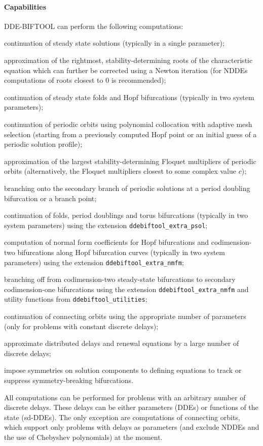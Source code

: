 \documentclass[10pt]{scrartcl}
\newcommand{\DDEBIFCODE}{\textsc{DDE-BIFTOOL}}
\begin{document}
\paragraph{Capabilities}
{\DDEBIFCODE} can perform the following computations:
\begin{compactitem}
\item continuation of steady state solutions (typically in a single
  parameter);
\item approximation of the rightmost, stability-determining roots of
  the characteristic equation which can further be corrected using a
  Newton iteration (for NDDEs computations of roots closest to $0$ is
  recommended);
\item continuation of steady state folds and Hopf bifurcations
  (typically in two system parameters);
\item continuation of periodic orbits using polynomial collocation
  with adaptive mesh selection (starting from a previously computed
  Hopf point or an initial guess of a periodic solution profile);
\item approximation of the largest stability-determining Floquet
  multipliers of periodic orbits (alternatively, the Floquet
  multipliers closest to some complex value $c$);
\item branching onto the secondary branch of periodic solutions at a
  period doubling bifurcation or a branch point;
\item continuation of folds, period doublings and torus bifurcations
  (typically in two system parameters) using the extension
  \texttt{ddebiftool\_extra\_psol};
\item computation of normal form coefficients for Hopf bifurcations
  and codimension-two bifurcations along Hopf bifurcation curves
  (typically in two system parameters) using the extension
  \texttt{ddebiftool\_extra\_nmfm};
\item branching off from codimension-two steady-state bifurcations to
  secondary codimension-one bifurcations using the extension
  \texttt{ddebiftool\_extra\_nmfm} and utility functions from
  \texttt{ddebiftool\_utilities};
\item continuation of connecting orbits using the appropriate number
  of parameters (only for problems with constant discrete delays);  
\item approximate distributed delays and renewal equations by a large
  number of discrete delays;
\item impose symmetries on solution components to defining equations
  to track or suppress symmetry-breaking bifurcations.
\end{compactitem}
All computations can be performed for problems with an arbitrary
number of discrete delays. These delays can be either parameters
(DDEs) or functions of the state (sd-DDEs).  The only exception are
computations of connecting orbits, which support only problems with
delays as parameters (and exclude NDDEs and the use of Chebyshev
polynomials) at the moment.
\end{document}

